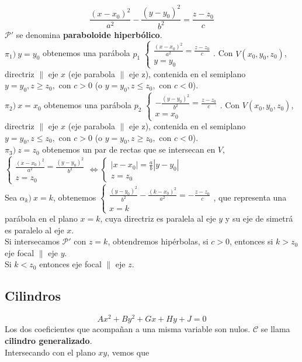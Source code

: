 \documentclass[11pt,a4paper]{article}
\begin{document}
$$\frac{(x-x_0)^2}{a^2} - \frac{(y-y_0)^2}{b^2} = \frac{z-z_0}{c}$$
$\mathcal{P'}$ se denomina \textbf{paraboloide hiperb\'olico}.\\
$\pi_1)\ y = y_0$ obtenemos una par\'abola $p_1$ $\left\{ \begin{array}{l} \frac{(x-x_0)^2}{a^2} = \frac{z-z_0}{c} \\ y = y_0 \end{array} \right.$. Con $V(x_0, y_0, z_0)$, directriz $\parallel$ eje $x$ (eje parabola $\parallel$ eje z), contenida en el semiplano $y=y_0, z \geq z_0,$ con $c>0$ (o $y=y_0, z \leq z_0, $ con $c<0$).\\
$\pi_2)\ x = x_0$ obtenemos una par\'abola $p_2$ $\left\{ \begin{array}{l} -\frac{(y-y_0)^2}{b^2} = \frac{z-z_0}{c} \\ x = x_0 \end{array} \right.$. Con $V(x_0, y_0, z_0)$, directriz $\parallel$ eje $x$ (eje parabola $\parallel$ eje z), contenida en el semiplano $y=y_0, z \leq z_0,$ con $c>0$ (o $y=y_0, z \geq z_0, $ con $c<0$).\\
$\pi_3)\ z = z_0$ obtenemos un par de rectas que se intersecan en $V$, $\begin{cases} \frac{(x-x_0)^2}{a^2} = \frac{(y-y_0)^2}{b^2} \\ z=z_0 \end{cases} \Leftrightarrow \begin{cases} |x-x_0| = \frac{a}{b} |y-y_0| \\ z=z_0 \end{cases}$
\\
Sea $\alpha_k)\ x=k$, obtenemos $\left\{ \begin{array}{l} \frac{(y-y_0)^2}{b^2} - \frac{(k-x_0)^2}{a^2} = - \frac{z-z_0}{c} \\ x = k \end{array} \right.$, que representa una par\'abola en el plano $x = k$, cuya directriz es paralela al eje $y$ y su eje de simetr\'a es paralelo al eje $x$.\\
Si intersecamos $\mathcal{P'}$ con $z=k$, obtendremos hip\'erbolas, si $c>0$, entonces si $k > z_0$ eje focal $\parallel$ eje $y$.\\ Si $k < z_0$ entonces eje focal $\parallel$ eje $z$.

\subsection{Cilindros}
$$Ax^2+By^2+Gx+Hy+J=0$$
Los dos coeficientes que acompañan a una misma variable son nulos. $\mathcal{C}$ se llama \textbf{cilindro generalizado}.\\
Intersecando con el plano $xy$, vemos que
\end{document}
